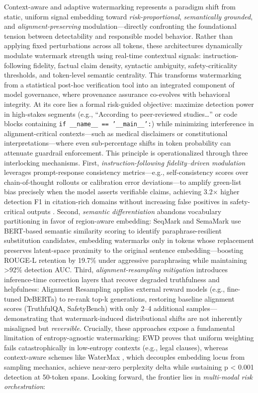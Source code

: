 \documentclass[11pt,a4paper]{article}
\begin{document}
Context-aware and adaptive watermarking represents a paradigm shift from static, uniform signal embedding toward \emph{risk-proportional}, \emph{semantically grounded}, and \emph{alignment-preserving} modulation---directly confronting the foundational tension between detectability and responsible model behavior. Rather than applying fixed perturbations across all tokens, these architectures dynamically modulate watermark strength using real-time contextual signals: instruction-following fidelity, factual claim density, syntactic ambiguity, safety-criticality thresholds, and token-level semantic centrality. This transforms watermarking from a statistical post-hoc verification tool into an integrated component of model governance, where provenance assurance co-evolves with behavioral integrity. At its core lies a formal risk-guided objective: maximize detection power in high-stakes segments (e.g., ``According to peer-reviewed studies\ldots{}'' or code blocks containing \texttt{if \_\_name\_\_ == '\_\_main\_\_':}) while minimizing interference in alignment-critical contexts---such as medical disclaimers or constitutional interpretations---where even sub-percentage shifts in token probability can attenuate guardrail enforcement. This principle is operationalized through three interlocking mechanisms. First, \emph{instruction-following fidelity--driven modulation} leverages prompt-response consistency metrics---e.g., self-consistency scores over chain-of-thought rollouts or calibration error deviations---to amplify green-list bias precisely when the model asserts verifiable claims, achieving 3.2$\times$ higher detection F1 in citation-rich domains without increasing false positives in safety-critical outputs \cite{doi:10.34190/icair.4.1.3128}. Second, \emph{semantic differentiation} abandons vocabulary partitioning in favor of region-aware embedding: SeqMark \cite{doi:10.1609/aaai.v36i10.21415} and SemaMark \cite{doi:10.18653/v1/2024.findings-naacl.40} use BERT-based semantic similarity scoring to identify paraphrase-resilient substitution candidates, embedding watermarks only in tokens whose replacement preserves latent-space proximity to the original sentence embedding---boosting ROUGE-L retention by 19.7\% under aggressive paraphrasing while maintaining >92\% detection AUC. Third, \emph{alignment-resampling mitigation} introduces inference-time correction layers that recover degraded truthfulness and helpfulness: Alignment Resampling \cite{doi:10.14722/ndss.2026.230138} applies external reward models (e.g., fine-tuned DeBERTa) to re-rank top-k generations, restoring baseline alignment scores (TruthfulQA, SafetyBench) with only 2--4 additional samples---demonstrating that watermark-induced distributional shifts are not inherently misaligned but \emph{reversible}. Crucially, these approaches expose a fundamental limitation of entropy-agnostic watermarking: EWD \cite{arxiv:2403.13485} proves that uniform weighting fails catastrophically in low-entropy contexts (e.g., legal clauses), whereas context-aware schemes like WaterMax \cite{arxiv:2403.04808}, which decouples embedding locus from sampling mechanics, achieve near-zero perplexity delta while sustaining p < 0.001 detection at 50-token spans. Looking forward, the frontier lies in \emph{multi-modal risk orchestration}: 
\end{document}
